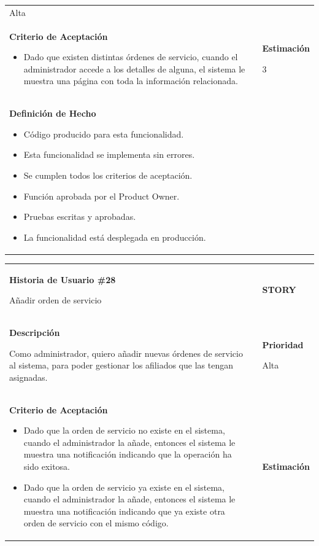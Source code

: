 \documentclass[12pt,a4paper]{article}
\begin{document}
\begin{center}
\begin{tabular}{| p{10cm} c p{2.5cm}|}
Alta\\

\textbf{Criterio de Aceptación}

\begin{itemize}
\item Dado que existen distintas órdenes de servicio, cuando el administrador
accede a los detalles de alguna, el sistema le muestra una página
con toda la información relacionada.
\end{itemize} & & \textbf{Estimación}

3 \\ 

\textbf{Definición de Hecho}

\begin{itemize}
\item Código producido para esta funcionalidad.
\item Esta funcionalidad se implementa sin errores.
\item Se cumplen todos los criterios de aceptación.
\item Función aprobada por el Product Owner.
\item Pruebas escritas y aprobadas.
\item La funcionalidad está desplegada en producción.
\end{itemize} & & \\
\hline  
\end{tabular}
\vspace{5mm}

\begin{tabular}{| p{10cm} c p{2.5cm}|}
\hline 
\textbf{Historia de Usuario \#28}

Añadir orden de servicio & & \textbf{{\Large STORY}} \\ 
\textbf{Descripción}

Como administrador, quiero añadir nuevas órdenes de servicio al sistema, para
poder gestionar los afiliados que las tengan asignadas. &  & \textbf{Prioridad}

Alta\\

\textbf{Criterio de Aceptación}

\begin{itemize}
\item Dado que la orden de servicio no existe en el sistema, cuando el
administrador la añade, entonces el sistema le muestra una
notificación indicando que la operación ha sido exitosa.
\item Dado que la orden de servicio ya existe en el sistema, cuando el
administrador la añade, entonces el sistema le muestra una
notificación indicando que ya existe otra orden de servicio con el mismo
código.
\end{itemize} & & \textbf{Estimación}


\end{tabular}
\end{center}
\end{document}
